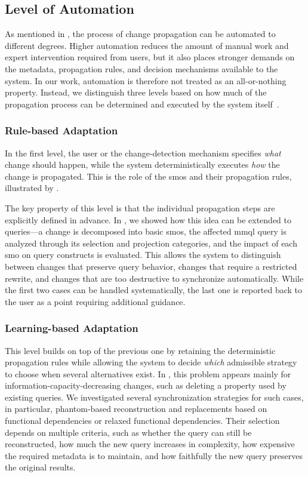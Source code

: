 \subsection{Level of Automation}
\label{sec:evolution-automation}

As mentioned in , the process of change propagation can be automated to different degrees. Higher automation reduces the amount of manual work and expert intervention required from users, but it also places stronger demands on the metadata, propagation rules, and decision mechanisms available to the system. In our work, automation is therefore not treated as an all-or-nothing property. Instead, we distinguish three levels based on how much of the propagation process can be determined and executed by the system itself~\citep{ideas2022vision}.

\subsubsection{Rule-based Adaptation}

In the first level, the user or the change-detection mechanism specifies \emph{what} change should happen, while the system deterministically executes \emph{how} the change is propagated. This is the role of the \acrshort{smo}s and their propagation rules, illustrated by .

The key property of this level is that the individual propagation steps are explicitly defined in advance. In , we showed how this idea can be extended to queries---a change is decomposed into basic \acrshort{smo}s, the affected \acrshort{mmql} query is analyzed through its selection and projection categories, and the impact of each \acrshort{smo} on query constructs is evaluated. This allows the system to distinguish between changes that preserve query behavior, changes that require a restricted rewrite, and changes that are too destructive to synchronize automatically. While the first two cases can be handled systematically, the last one is reported back to the user as a point requiring additional guidance.

\subsubsection{Learning-based Adaptation}

This level builds on top of the previous one by retaining the deterministic propagation rules while allowing the system to decide \emph{which} admissible strategy to choose when several alternatives exist. In , this problem appears mainly for information-capacity-decreasing changes, such as deleting a property used by existing queries. We investigated several synchronization strategies for such cases, in particular, phantom-based reconstruction and replacements based on functional dependencies or relaxed functional dependencies. Their selection depends on multiple criteria, such as whether the query can still be reconstructed, how much the new query increases in complexity, how expensive the required metadata is to maintain, and how faithfully the new query preserves the original results.

